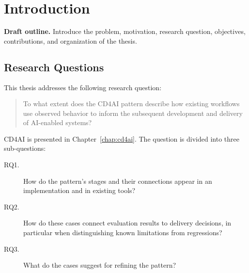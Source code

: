 \chapter{Introduction}
\label{chap:introduction}

\textbf{Draft outline.} Introduce the problem, motivation, research question,
objectives, contributions, and organization of the thesis.




%


\section{Research Questions}
\label{sec:research-questions}

This thesis addresses the following research question:

\begin{quote}
To what extent does the CD4AI pattern describe how existing workflows use
observed behavior to inform the subsequent development and delivery of
AI-enabled systems?
\end{quote}

CD4AI is presented in Chapter~\ref{chap:cd4ai}. The question is divided into
three sub-questions:

\begin{description}
  \item[RQ1.] How do the pattern's stages and their connections appear in an
    implementation and in existing tools?
  \item[RQ2.] How do these cases connect evaluation results to delivery
    decisions, in particular when distinguishing known limitations from
    regressions?
  \item[RQ3.] What do the cases suggest for refining the pattern?
\end{description}

